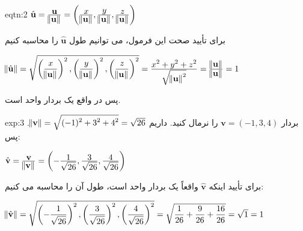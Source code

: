 {\begin{spacing}{1.5}
        \begin{eqtn}{eqtn:2}
            \centering
            $\hat{\textbf{u}}=\frac{\displaystyle\textbf{u}}{\displaystyle\norm{\textbf{u}}}=\left(\frac{\displaystyle x}{\displaystyle\norm{\textbf{u}}},
            \frac{\displaystyle y}{\displaystyle\norm{\textbf{u}}}, \frac{\displaystyle z}{\displaystyle\norm{\textbf{u}}}\right)$
        \end{eqtn}

        برای تأیید صحت این فرمول، می توانیم طول $\hat{\textbf{u}}$ را محاسبه کنیم

        \begin{center}
            $\norm{\hat{\textbf{u}}}=\sqrt{\displaystyle \left(\frac{\displaystyle x}{\displaystyle\norm{\textbf{u}}}\right)^2,
                \left(\frac{\displaystyle y}{\displaystyle\norm{\textbf{u}}}\right)^2,
                \left(\frac{\displaystyle z}{\displaystyle\norm{\textbf{u}}}\right)^2}=\frac{\displaystyle x^2+y^2+z^2}{\displaystyle\sqrt{\displaystyle \norm{\textbf{u}}^2}}
            =\frac{\displaystyle\norm{\textbf{u}}}{\displaystyle\norm{\textbf{u}}}=1$
        \end{center}

        پس  در واقع یک بردار واحد است.

        \begin{example}{exp:3}
            بردار $\textbf{v}=(-1,3,4)$ را نرمال کنید. داریم $\norm{\textbf{v}}=\sqrt{\displaystyle (-1)^2+3^2+4^2}=\sqrt{\displaystyle 26}$. پس:

            \begin{center}
                $\hat{\textbf{v}}=\frac{\displaystyle\textbf{v}}{\displaystyle\norm{\textbf{v}}}=\left(-\frac{\displaystyle 1}{\displaystyle\sqrt{\displaystyle 26}},
                \frac{\displaystyle 3}{\displaystyle\sqrt{\displaystyle 26}}, \frac{\displaystyle 4}{\displaystyle\sqrt{\displaystyle 26}}\right)$
            \end{center}

            برای تأیید اینکه $\hat{\textbf{v}}$ واقعاً یک بردار واحد است، طول آن را محاسبه می کنیم:

            \begin{center}
                $\norm{\hat{\textbf{v}}}=\sqrt{\displaystyle \left(-\frac{\displaystyle 1}{\displaystyle\sqrt{\displaystyle 26}}\right)^2,
                    \left(\frac{\displaystyle 3}{\displaystyle\sqrt{\displaystyle 26}}\right)^2, \left(\frac{\displaystyle 4}{\displaystyle\sqrt{\displaystyle 26}}\right)^2}=
                \sqrt{\displaystyle\frac{\displaystyle 1}{\displaystyle 26}+\frac{\displaystyle 9}{\displaystyle 26}+\frac{\displaystyle 16}{\displaystyle 26}}=\sqrt{\displaystyle 1}=1$
            \end{center}
        \end{example}
    \end{spacing}
}


